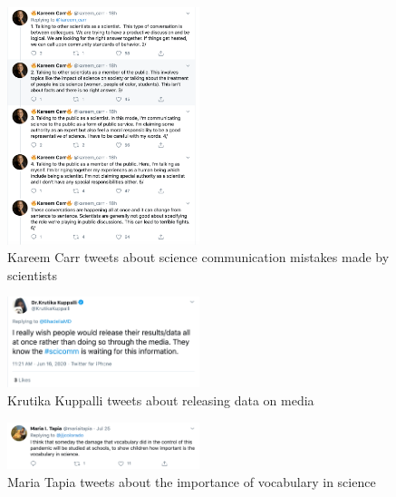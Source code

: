 \documentclass[acmsmall,authordraft]{acmart}
\begin{document}
\begin{figure}
  \includegraphics[width=0.5\textwidth]{Pictures/Appendix_Tweets/kareem carr tweet2 contd.png}
  \caption{Kareem Carr tweets about science communication mistakes made by scientists}
  \label{kareem_carr_tweet2_contd}
\end{figure}

\begin{figure}
  \includegraphics[width=0.5\textwidth]{Pictures/Appendix_Tweets/krutika kuppalli tweet.png}
  \caption{Krutika Kuppalli tweets about releasing data on media}
  \label{krutika_kuppalli_tweet}
\end{figure}

\begin{figure}
  \includegraphics[width=0.5\textwidth]{Pictures/Appendix_Tweets/maria tapia tweet.png}
  \caption{Maria Tapia tweets about the importance of vocabulary in science}
  \label{maria_tapia_tweet}
\end{figure}
\end{document}
